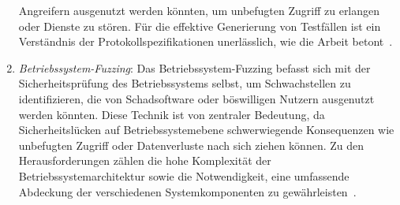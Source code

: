 \begin{enumerate}
    Angreifern ausgenutzt werden könnten, um unbefugten Zugriff zu erlangen oder Dienste zu stören.
    Für die effektive Generierung von Testfällen ist ein Verständnis der Protokollspezifikationen unerlässlich, wie die Arbeit
    betont~\cite{eceiza_fuzzing_2021}.
    \item \textit{Betriebssystem-Fuzzing}: Das Betriebssystem-Fuzzing befasst sich mit der Sicherheitsprüfung des Betriebssystems selbst, um Schwachstellen zu identifizieren,
    die von Schadsoftware oder böswilligen Nutzern ausgenutzt werden könnten.
    Diese Technik ist von zentraler Bedeutung, da Sicherheitslücken auf Betriebssystemebene schwerwiegende Konsequenzen wie
    unbefugten Zugriff oder Datenverluste nach sich ziehen können.
    Zu den Herausforderungen zählen die hohe Komplexität der Betriebssystemarchitektur sowie die Notwendigkeit, eine umfassende
    Abdeckung der verschiedenen Systemkomponenten zu gewährleisten~\cite{eceiza_fuzzing_2021}.
\end{enumerate}
